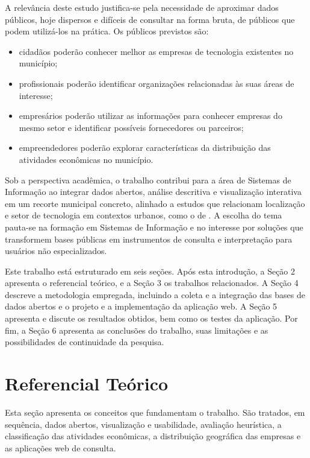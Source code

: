 A relevância deste estudo justifica-se pela necessidade de aproximar dados públicos, hoje dispersos e difíceis de consultar na forma bruta, de públicos que podem utilizá-los na prática.
Os públicos previstos são:

\begin{itemize}
    \item cidadãos poderão conhecer melhor as empresas de tecnologia existentes no município;
    \item profissionais poderão identificar organizações relacionadas às suas áreas de interesse;
    \item empresários poderão utilizar as informações para conhecer empresas do mesmo setor e identificar possíveis fornecedores ou parceiros;
    \item empreendedores poderão explorar características da distribuição das atividades econômicas no município.
\end{itemize}

Sob a perspectiva acadêmica, o trabalho contribui para a área de Sistemas de Informação ao integrar dados abertos, análise descritiva e visualização interativa em um recorte municipal concreto, alinhado a estudos que relacionam localização e setor de tecnologia em contextos urbanos, como o de .
A escolha do tema pauta-se na formação em Sistemas de Informação e no interesse por soluções que transformem bases públicas em instrumentos de consulta e interpretação para usuários não especializados.

Este trabalho está estruturado em seis seções.
Após esta introdução, a Seção 2 apresenta o referencial teórico, e a Seção 3 os trabalhos relacionados.
A Seção 4 descreve a metodologia empregada, incluindo a coleta e a integração das bases de dados abertos e o projeto e a implementação da aplicação web.
A Seção 5 apresenta e discute os resultados obtidos, bem como os testes da aplicação.
Por fim, a Seção 6 apresenta as conclusões do trabalho, suas limitações e as possibilidades de continuidade da pesquisa.

\section{Referencial Teórico}

Esta seção apresenta os conceitos que fundamentam o trabalho.
São tratados, em sequência, dados abertos, visualização e usabilidade, avaliação heurística, a classificação das atividades econômicas, a distribuição geográfica das empresas e as aplicações web de consulta.

